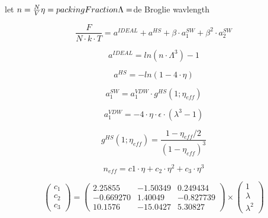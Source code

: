 \begin{multicols}{2}
let $n=\frac{N}{V}\newline\eta=packingFraction\newline\Lambda=$de Broglie wavlength

\begin{equation}\label{eq:saftF18}
\frac{F}{N\cdot k\cdot T}=a^{IDEAL}+a^{HS}+\beta\cdot a_1^{SW}+\beta^2\cdot a_2^{SW}
\end{equation}

\begin{equation}\label{eq:saftF1a}
a^{IDEAL}=ln\left(n\cdot \Lambda^3\right)-1
\end{equation}

\begin{equation}\label{eq:saftF1b}
a^{HS}=-ln(1-4\cdot \eta)
\end{equation}

\begin{equation}\label{eq:saftF34}
a_1^{SW}=a_1^{VDW}\cdot g^{HS}(1;\eta_{eff})
\end{equation}

\begin{equation}\label{eq:saftF35}
a_1^{VDW}=-4\cdot \eta\cdot \epsilon\cdot (\lambda^3-1)
\end{equation}

\begin{equation}\label{eq:saftF33}
g^{HS}(1;\eta_{eff})=\frac{1-\eta_{eff}/2}{(1-\eta_{eff})^3}
\end{equation}

\begin{equation}\label{eq:saftF36}
n_{eff}=c1\cdot \eta+c_2\cdot \eta^2+c_3\cdot \eta^3
\end{equation}

\begin{equation}\label{eq:saftF37}
\scriptscriptstyle
\begin{pmatrix}c_1\\c_2\\c_3\end{pmatrix}=
\begin{pmatrix}
2.25855 & -1.50349 & 0.249434 \\
-0.669270 & 1.40049 & -0.827739 \\
10.1576 & -15.0427 & 5.30827
\end{pmatrix}\times
\begin{pmatrix}
1\\ \lambda \\ \lambda^2
\end{pmatrix}
\end{equation}


\end{multicols}
